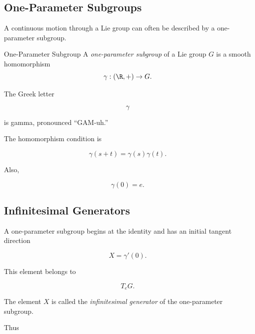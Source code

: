 \subsection{One-Parameter Subgroups}
\label{subsec:one-parameter-subgroups}

A continuous motion through a Lie group can often be described by a
one-parameter subgroup.

\begin{definitionbox}{One-Parameter Subgroup}
A \emph{one-parameter subgroup} of a Lie group \(G\) is a smooth
homomorphism
\[ \gamma:(\R,+)\to G. \]
\end{definitionbox}

The Greek letter

\[ \gamma \]

is gamma, pronounced ``GAM-uh.''

The homomorphism condition is

\[ \gamma(s+t)=\gamma(s)\gamma(t). \]

Also,

\[ \gamma(0)=e. \]

\subsection{Infinitesimal Generators}
\label{subsec:infinitesimal-generators}

A one-parameter subgroup begins at the identity and has an initial tangent
direction

\[ X=\gamma'(0). \]

This element belongs to

\[ T_eG. \]

The element \(X\) is called the \emph{infinitesimal generator} of the
one-parameter subgroup.

Thus

\begin{center}
\end{center}

